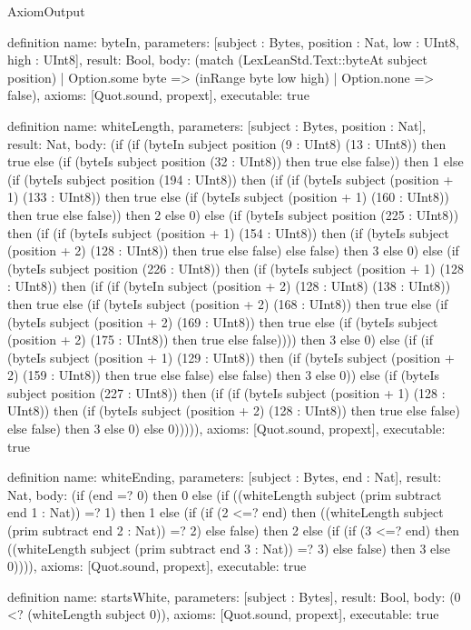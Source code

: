 \begin{lexlean}{AxiomOutput}
\begin{semanticmodule}
definition{
  name: byteIn,
  parameters: [subject : Bytes, position : Nat, low : UInt8, high : UInt8],
  result: Bool,
  body: (match (LexLeanStd.Text::byteAt subject position)
    | Option.some byte => (inRange byte low high)
    | Option.none => false),
  axioms: [Quot.sound, propext],
  executable: true
}

definition{
  name: whiteLength,
  parameters: [subject : Bytes, position : Nat],
  result: Nat,
  body: (if (if (byteIn subject position (9 : UInt8) (13 : UInt8)) then true else (if (byteIs subject position (32 : UInt8)) then true else false)) then 1 else (if (byteIs subject position (194 : UInt8)) then (if (if (byteIs subject (position + 1) (133 : UInt8)) then true else (if (byteIs subject (position + 1) (160 : UInt8)) then true else false)) then 2 else 0) else (if (byteIs subject position (225 : UInt8)) then (if (if (byteIs subject (position + 1) (154 : UInt8)) then (if (byteIs subject (position + 2) (128 : UInt8)) then true else false) else false) then 3 else 0) else (if (byteIs subject position (226 : UInt8)) then (if (byteIs subject (position + 1) (128 : UInt8)) then (if (if (byteIn subject (position + 2) (128 : UInt8) (138 : UInt8)) then true else (if (byteIs subject (position + 2) (168 : UInt8)) then true else (if (byteIs subject (position + 2) (169 : UInt8)) then true else (if (byteIs subject (position + 2) (175 : UInt8)) then true else false)))) then 3 else 0) else (if (if (byteIs subject (position + 1) (129 : UInt8)) then (if (byteIs subject (position + 2) (159 : UInt8)) then true else false) else false) then 3 else 0)) else (if (byteIs subject position (227 : UInt8)) then (if (if (byteIs subject (position + 1) (128 : UInt8)) then (if (byteIs subject (position + 2) (128 : UInt8)) then true else false) else false) then 3 else 0) else 0))))),
  axioms: [Quot.sound, propext],
  executable: true
}

definition{
  name: whiteEnding,
  parameters: [subject : Bytes, end : Nat],
  result: Nat,
  body: (if (end =? 0) then 0 else (if ((whiteLength subject (prim subtract end 1 : Nat)) =? 1) then 1 else (if (if (2 <=? end) then ((whiteLength subject (prim subtract end 2 : Nat)) =? 2) else false) then 2 else (if (if (3 <=? end) then ((whiteLength subject (prim subtract end 3 : Nat)) =? 3) else false) then 3 else 0)))),
  axioms: [Quot.sound, propext],
  executable: true
}

definition{
  name: startsWhite,
  parameters: [subject : Bytes],
  result: Bool,
  body: (0 <? (whiteLength subject 0)),
  axioms: [Quot.sound, propext],
  executable: true
}


\end{semanticmodule}
\end{lexlean}
